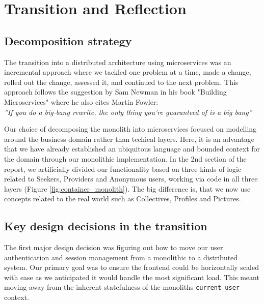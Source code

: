 \newpage
\section{Transition and Reflection}

\subsection{Decomposition strategy}
The transition into a distributed architecture using microservices was an incremental approach
where we tackled one problem at a time, made a change, rolled out the change, assessed it, and continued to the next problem.
This approach follows the suggestion by Sam Newman in his book "Building Microservices" where he also cites Martin Fowler: \\
\emph{''If you do a big-bang rewrite, the only thing you’re guaranteed of is a big
bang''} \cite[102]{microservicebook}

Our choice of decomposing the monolith into microservices focused on modelling around the business domain rather than techical layers.
Here, it is an advantage that we have already established an ubiquitous language and bounded context for the domain through our monolithic implementation.
In the 2nd section of the report, we artificially divided our functionality based on three kinds of logic related to Seekers, Providers and Anonymous users, 
working via code in all three layers (Figure \ref{fig:container_monolith}).
The big difference is, that we now use concepts related to the real world such as Collectives, Profiles and Pictures.



\subsection{Key design decisions in the transition}

The first major design decision was figuring out how to move our user authentication and session management from a monolithic to a distributed system.
Our primary goal was to ensure the frontend could be horizontally scaled with ease as we anticipated it would handle the
most significant load. This meant moving away from the inherent statefulness of the monoliths \verb|current_user| context.


